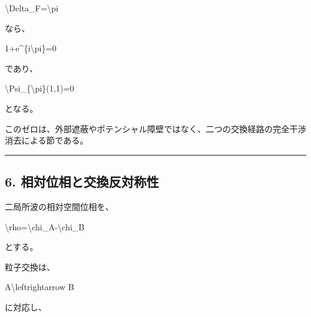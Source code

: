 \documentclass[
  a4paper,
]{article}
\newenvironment{Shaded}{}{}
\newcommand{\NormalTok}[1]{#1}
\begin{document}
\begin{Shaded}
\begin{Highlighting}[]
\NormalTok{\textbackslash{}Delta\_F=\textbackslash{}pi}
\end{Highlighting}
\end{Shaded}

なら、

\begin{Shaded}
\begin{Highlighting}[]
\NormalTok{1+e\^{}\{i\textbackslash{}pi\}=0}
\end{Highlighting}
\end{Shaded}

であり、

\begin{Shaded}
\begin{Highlighting}[]
\NormalTok{\textbackslash{}Psi\_\{\textbackslash{}pi\}(1,1)=0}
\end{Highlighting}
\end{Shaded}

となる。

このゼロは、外部遮蔽やポテンシャル障壁ではなく、二つの交換経路の完全干渉消去による節である。

\begin{center}\rule{0.5\linewidth}{0.5pt}\end{center}

\subsection{6.
相対位相と交換反対称性}\label{ux76f8ux5bfeux4f4dux76f8ux3068ux4ea4ux63dbux53cdux5bfeux79f0ux6027}

二局所波の相対空間位相を、

\begin{Shaded}
\begin{Highlighting}[]
\NormalTok{\textbackslash{}rho=\textbackslash{}chi\_A{-}\textbackslash{}chi\_B}
\end{Highlighting}
\end{Shaded}

とする。

粒子交換は、

\begin{Shaded}
\begin{Highlighting}[]
\NormalTok{A\textbackslash{}leftrightarrow B}
\end{Highlighting}
\end{Shaded}

に対応し、
\end{document}
